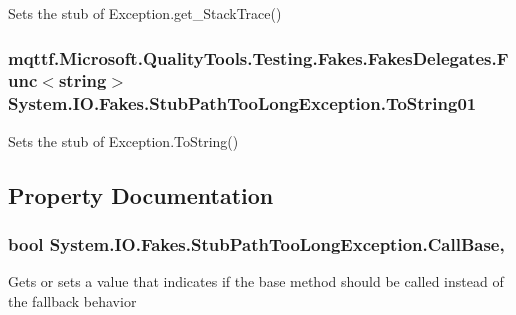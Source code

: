 Sets the stub of Exception.\-get\-\_\-\-Stack\-Trace()

\hypertarget{class_system_1_1_i_o_1_1_fakes_1_1_stub_path_too_long_exception_aa68fcad7bc708f650f958862e06dd405}{
\subsubsection[{To\-String01}]{\setlength{\rightskip}{0pt plus 5cm}mqttf.\-Microsoft.\-Quality\-Tools.\-Testing.\-Fakes.\-Fakes\-Delegates.\-Func$<$string$>$ System.\-I\-O.\-Fakes.\-Stub\-Path\-Too\-Long\-Exception.\-To\-String01}}\label{class_system_1_1_i_o_1_1_fakes_1_1_stub_path_too_long_exception_aa68fcad7bc708f650f958862e06dd405}


Sets the stub of Exception.\-To\-String()



\subsection{Property Documentation}
\hypertarget{class_system_1_1_i_o_1_1_fakes_1_1_stub_path_too_long_exception_ac905618f7c31e16a4f71b50ff517916f}{
\subsubsection[{Call\-Base}]{\setlength{\rightskip}{0pt plus 5cm}bool System.\-I\-O.\-Fakes.\-Stub\-Path\-Too\-Long\-Exception.\-Call\-Base\hspace{0.3cm}{\ttfamily [get]}, {\ttfamily [set]}}}\label{class_system_1_1_i_o_1_1_fakes_1_1_stub_path_too_long_exception_ac905618f7c31e16a4f71b50ff517916f}


Gets or sets a value that indicates if the base method should be called instead of the fallback behavior

